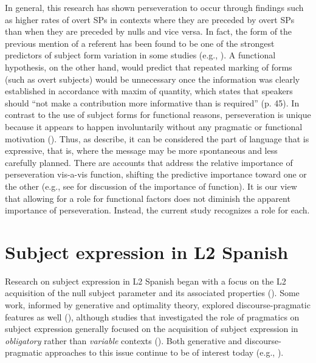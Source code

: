 \documentclass[output=paper]{langscibook}
\begin{document}
In general, this research has shown perseveration to occur through findings such as higher rates of overt SPs in contexts where they are preceded by overt SPs than when they are preceded by nulls and vice versa. In fact, the form of the previous mention of a referent has been found to be one of the strongest predictors of subject form variation in some studies (e.g., \citealt{CarvalhoChild2011, TorresTravis2010}). A functional hypothesis, on the other hand, would predict that repeated marking of forms (such as overt subjects) would be unnecessary once the information was clearly established in accordance with  maxim of quantity, which states that speakers should “not make a contribution more informative than is required” (p. 45). In contrast to the use of subject forms for functional reasons, perseveration is unique because it appears to happen involuntarily without any pragmatic or functional motivation (\citealt{CameronFlores-Ferrán2004}). Thus, as \citet{CameronFlores-Ferrán2004} describe, it can be considered the part of language that is expressive, that is, where the message may be more spontaneous and less carefully planned. There are accounts that address the relative importance of perseveration vis-a-vis function, shifting the predictive importance toward one or the other (e.g., see \citealt{Otheguy2015} for discussion of the importance of function). It is our view that allowing for a role for functional factors does not diminish the apparent importance of perseveration. Instead, the current study recognizes a role for each.



\section{Subject expression in L2 Spanish}\label{sec:geeslin:4}

Research on subject expression in L2 Spanish began with a focus on the L2 acquisition of the null subject parameter and its associated properties (\citealt{Al-KaseyPérez-Leroux1998, Bini1993, Emberson1987, Galvan1999, Isabelli2004, Liceras1989, LicerasEtAl1997, Phinney1987, White1985}). Some work, informed by generative and optimality theory, explored discourse-pragmatic features as well (\citealt{LaFond2002, LafondEtAl2000, MontrulRodríguezLouro2006, Rothman2007}), although studies that investigated the role of pragmatics on subject expression generally focused on the acquisition of subject expression in \textit{obligatory} rather than \textit{variable} contexts (\citealt{BlackwellQuesada2012, QuesadaBlackwell2009, Rothman2009}). Both generative and discourse-pragmatic approaches to this issue continue to be of interest today (e.g., \citealt{Lozano2002,Lozano2016}).
\end{document}

